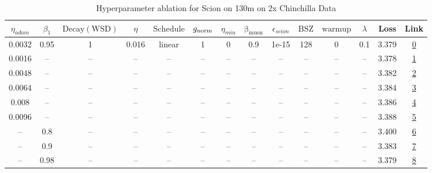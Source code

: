 \begin{table}[H]
\centering
\caption{Hyperparameter ablation for Scion on 130m on 2x Chinchilla Data}
\label{tab:ablation_scion_130m_on_2x_chinchilla_data}
\begin{tabular}{cccccccccccccc}
\toprule
$\eta_{adam}$ & $\beta_1$ & $\mathrm{Decay (WSD)}$ & $\eta$ & $\mathrm{Schedule}$ & $g_{\mathrm{norm}}$ & $\eta_{min}$ & $\mathrm{\beta_{muon}}$ & $\epsilon_{scion}$ & $\mathrm{BSZ}$ & $\mathrm{warmup}$ & $\lambda$ & Loss & Link \\
\midrule
0.0032 & 0.95 & 1 & 0.016 & linear & 1 & 0 & 0.9 & 1e-15 & 128 & 0 & 0.1 & 3.379 & \href{https://wandb.ai/marin-community/optimizer-scaling/runs/sweep-130m-5B-sciona647e8lr0.016-wd0.1-minlr0-warmup0-b10.95-gn1-9e502b}{0} \\
\midrule
0.0016 & -- & -- & -- & -- & -- & -- & -- & -- & -- & -- & -- & 3.378 & \href{https://wandb.ai/marin-community/optimizer-scaling/runs/sweep-130m-5B-scion0749aelr0.016-wd0.1-minlr0-warmup0-b10.95-gn1-9268f7}{1} \\
0.0048 & -- & -- & -- & -- & -- & -- & -- & -- & -- & -- & -- & 3.382 & \href{https://wandb.ai/marin-community/optimizer-scaling/runs/sweep-130m-5B-scionecb2fclr0.016-wd0.1-minlr0-warmup0-b10.95-gn1-4bd5ef}{2} \\
0.0064 & -- & -- & -- & -- & -- & -- & -- & -- & -- & -- & -- & 3.384 & \href{https://wandb.ai/marin-community/optimizer-scaling/runs/sweep-130m-5B-scion11cb39lr0.016-wd0.1-minlr0-warmup0-b10.95-gn1-7d2058}{3} \\
0.008 & -- & -- & -- & -- & -- & -- & -- & -- & -- & -- & -- & 3.386 & \href{https://wandb.ai/marin-community/optimizer-scaling/runs/sweep-130m-5B-scione17102lr0.016-wd0.1-minlr0-warmup0-b10.95-gn1-a96653}{4} \\
0.0096 & -- & -- & -- & -- & -- & -- & -- & -- & -- & -- & -- & 3.388 & \href{https://wandb.ai/marin-community/optimizer-scaling/runs/sweep-130m-5B-scionf605fclr0.016-wd0.1-minlr0-warmup0-b10.95-gn1-ae9ebc}{5} \\
-- & 0.8 & -- & -- & -- & -- & -- & -- & -- & -- & -- & -- & 3.400 & \href{https://wandb.ai/marin-community/optimizer-scaling/runs/sweep-130m-5B-scionb7ae93lr0.016-wd0.1-minlr0-warmup0-b10.8-gn1--6ad4dc}{6} \\
-- & 0.9 & -- & -- & -- & -- & -- & -- & -- & -- & -- & -- & 3.383 & \href{https://wandb.ai/marin-community/optimizer-scaling/runs/sweep-130m-5B-scion6cb7fflr0.016-wd0.1-minlr0-warmup0-b10.9-gn1--4a658c}{7} \\
-- & 0.98 & -- & -- & -- & -- & -- & -- & -- & -- & -- & -- & 3.379 & \href{https://wandb.ai/marin-community/optimizer-scaling/runs/sweep-130m-5B-scion277086lr0.016-wd0.1-minlr0-warmup0-b10.98-gn1-5c8c93}{8} \\

\end{tabular}
\end{table}
